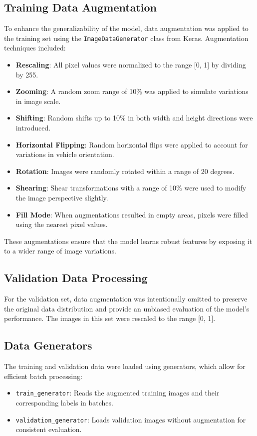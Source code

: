 \documentclass{article}
\begin{document}
\subsection{Training Data Augmentation}

To enhance the generalizability of the model, data augmentation was applied to the training set using the \texttt{ImageDataGenerator} class from Keras. Augmentation techniques included:

\begin{itemize}
    \item \textbf{Rescaling}: All pixel values were normalized to the range [0, 1] by dividing by 255.
    \item \textbf{Zooming}: A random zoom range of 10\% was applied to simulate variations in image scale.
    \item \textbf{Shifting}: Random shifts up to 10\% in both width and height directions were introduced.
    \item \textbf{Horizontal Flipping}: Random horizontal flips were applied to account for variations in vehicle orientation.
    \item \textbf{Rotation}: Images were randomly rotated within a range of 20 degrees.
    \item \textbf{Shearing}: Shear transformations with a range of 10\% were used to modify the image perspective slightly.
    \item \textbf{Fill Mode}: When augmentations resulted in empty areas, pixels were filled using the nearest pixel values.
\end{itemize}

These augmentations ensure that the model learns robust features by exposing it to a wider range of image variations.

\subsection{Validation Data Processing}

For the validation set, data augmentation was intentionally omitted to preserve the original data distribution and provide an unbiased evaluation of the model's performance. The images in this set were rescaled to the range [0, 1].

\subsection{Data Generators}

The training and validation data were loaded using generators, which allow for efficient batch processing:
\begin{itemize}
    \item \texttt{train\_generator}: Reads the augmented training images and their corresponding labels in batches.
    \item \texttt{validation\_generator}: Loads validation images without augmentation for consistent evaluation.
\end{itemize}
\end{document}
